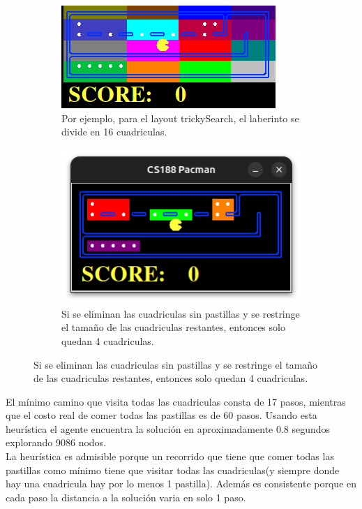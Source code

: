 \documentclass[12pt, titlepage, a4paper]{article}
\begin{document}
\begin{figure}[H]
    \begin{subfigure}{0.5\textwidth}
    \centering
    \includegraphics[width=.9\textwidth]{Imagenes/Captura desde 2025-04-09 20-07-23.png}
    \caption{Por ejemplo, para el layout trickySearch, el laberinto se divide en 16 cuadriculas.}
    \end{subfigure}%
    \begin{subfigure}[t]{0.5\textwidth}
    \centering
    \includegraphics[width=.9\textwidth]{Imagenes/image.png}
    \caption{Si se eliminan las cuadriculas sin pastillas y se restringe el tamaño de las cuadriculas restantes, entonces solo quedan 4 cuadriculas.}
    \end{subfigure}
\end{figure}




El mínimo camino que visita todas las cuadriculas consta de 17 pasos, mientras
que el costo real de comer todas las pastillas es de 60 pasos. Usando esta
heurística el agente encuentra la solución en aproximadamente 0.8 segundos
explorando 9086 nodos.\\

La heurística es admisible porque un recorrido que tiene que comer todas las
pastillas como mínimo tiene que visitar todas las cuadriculas(y siempre donde
hay una cuadricula hay por lo menos 1 pastilla). Además es consistente porque en cada paso la distancia a la solución varia en solo 1 paso.\\
\end{document}
